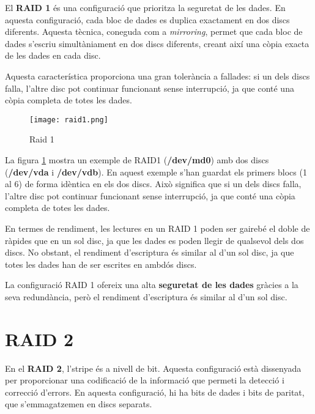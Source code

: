 El \textbf{RAID 1} és una configuració que prioritza la seguretat de les dades. En aquesta configuració, cada bloc de dades es duplica exactament en dos discs diferents. Aquesta tècnica, coneguda com a \emph{mirroring}, permet que cada bloc de dades s'escriu simultàniament en dos discs diferents, creant així una còpia exacta de les dades en cada disc. 

Aquesta característica proporciona una gran tolerància a fallades: si un dels discs falla, l'altre disc pot continuar funcionant sense interrupció, ja que conté una còpia completa de totes les dades.

\begin{figure}[!htb]
\centering
\texttt{[image: raid1.png]}
\caption{Raid 1}
\label{fig:raid1}
\end{figure}

La figura \ref{fig:raid1} mostra un exemple de RAID1 (\textbf{/dev/md0}) amb dos discs (\textbf{/dev/vda} i \textbf{/dev/vdb}). En aquest exemple s'han guardat els primers blocs (1 al 6) de forma idèntica en els dos discs. Això significa que si un dels discs falla, l'altre disc pot continuar funcionant sense interrupció, ja que conté una còpia completa de totes les dades.

En termes de rendiment, les lectures en un RAID 1 poden ser gairebé el doble de ràpides que en un sol disc, ja que les dades es poden llegir de qualsevol dels dos discs. No obstant, el rendiment d'escriptura és similar al d'un sol disc, ja que totes les dades han de ser escrites en ambdós discs.

\begin{info}
La configuració RAID 1 ofereix una alta \textbf{seguretat de les dades} gràcies a la seva redundància, però el rendiment d'escriptura és similar al d'un sol disc.
\end{info}

\section{RAID 2}\label{raid-2}

En el \textbf{RAID 2}, l'stripe és a nivell de bit. Aquesta configuració està dissenyada per proporcionar una codificació de la informació que permeti la detecció i correcció d'errors. En aquesta configuració, hi ha bits de dades i bits de paritat, que s'emmagatzemen en discs separats.

